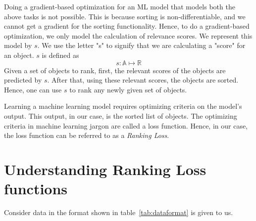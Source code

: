 \documentclass[12pt, twoside, ngerman]{report}
\begin{document}
Doing a gradient-based optimization for an ML model that models both the above tasks is not possible.
This is because sorting is non-differentiable, and we cannot get a gradient for the sorting functionality.
Hence, to do a gradient-based optimization, we only model the calculation of relevance scores.
We represent this model by $s$.
We use the letter "s" to signify that we are calculating a "score" for an object. $s$ is defined as
$$
s : \mathbb{A} \mapsto \mathbb{R}
$$
Given a set of objects to rank, first, the relevant scores of the objects are predicted by $s$. After that, using these relevant scores,  the objects are sorted.
Hence, one can use $s$ to rank any newly given set of objects.

Learning a machine learning model requires optimizing criteria on the model's output.
This output, in our case, is the sorted list of objects.
The optimizing criteria in machine learning jargon are called a loss function.
Hence,  in our case, the loss function can be referred to as a \textit{Ranking Loss}.

\section{Understanding Ranking Loss functions}

Consider data in the format shown in table~\ref{tab:dataformat} is given to us.
\end{document}
